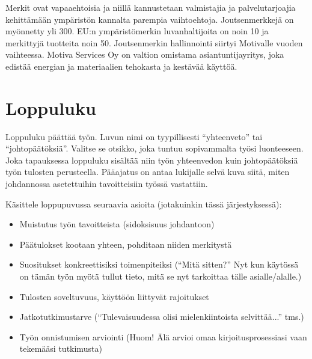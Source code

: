 Merkit ovat vapaaehtoisia ja niillä kannustetaan valmistajia ja
palvelutarjoajia kehittämään ympäristön kannalta parempia
vaihtoehtoja. Joutsenmerkkejä on myönnetty yli 300. EU:n
ympäristömerkin luvanhaltijoita on noin 10 ja merkittyjä tuotteita
noin 50.  Joutsenmerkin hallinnointi siirtyi Motivalle vuoden
vaihteessa. Motiva Services Oy on valtion omistama asiantuntijayritys,
joka edistää energian ja materiaalien tehokasta ja kestävää käyttöä.


\section{Loppuluku}

Loppuluku päättää työn. Luvun nimi on tyypillisesti ``yhteenveto'' tai
``johtopäätöksiä''. Valitse se otsikko, joka tuntuu sopivammalta työsi
luonteeseen. Joka tapauksessa loppuluku sisältää niin työn yhteenvedon
kuin johtopäätöksiä työn tulosten perusteella. Pääajatus on antaa
lukijalle selvä kuva siitä, miten johdannossa asetettuihin
tavoitteisiin työssä vastattiin.

Käsittele loppupuvussa seuraavia asioita (jotakuinkin tässä järjestyksessä):
%
\begin{itemize}
  \item Muistutus työn tavoitteista (sidoksisuus johdantoon)
  \item Päätulokset kootaan yhteen, pohditaan niiden merkitystä
  \item Suositukset konkreettisiksi toimenpiteiksi (``Mitä sitten?'' 
Nyt kun käytössä on tämän työn myötä tullut tieto, 
mitä se nyt tarkoittaa tälle asialle/alalle.)
  \item Tulosten soveltuvuus, käyttöön liittyvät rajoitukset
  \item Jatkotutkimustarve 
(``Tulevaisuudessa olisi mielenkiintoista selvittää...'' tms.)
  \item Työn onnistumisen arviointi 
(Huom! Älä arvioi omaa kirjoitusprosessiasi vaan tekemääsi tutkimusta)
\end{itemize}


